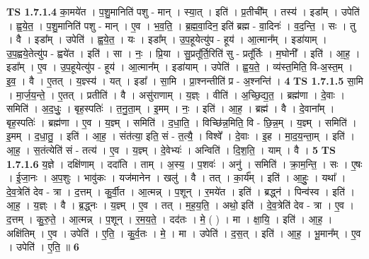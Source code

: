 \documentclass[17pt]{extarticle}
\begin{document}
                  \newline
                                \textbf{ TS 1.7.1.4} \newline
                  का॒मये॑त । प॒शु॒मानिति॑ पशु - मान् । स्या॒त् । इति॑ । प्र॒तीची᳚म् । तस्य॑ । इडा᳚म् । उपेति॑ । ह्व॒ये॒त॒ । प॒शु॒मानिति॑ पशु - मान् । ए॒व । भ॒व॒ति॒ । ब्र॒ह्म॒वा॒दिन॒ इति॑ ब्रह्म - वा॒दिनः॑ । व॒द॒न्ति॒ । सः । तु । वै । इडा᳚म् । उपेति॑ । ह्व॒ये॒त॒ । यः । इडा᳚म् । उ॒प॒हूयेत्यु॑प - हूय॑ । आ॒त्मान᳚म् । इडा॑याम् । उ॒प॒ह्वये॒तेत्यु॑प - ह्वये॑त । इति॑ । सा । नः॒ । प्रि॒या । सु॒प्रतू᳚र्ति॒रिति॑ सु - प्रतू᳚र्तिः । म॒घोनी᳚ । इति॑ । आ॒ह॒ । इडा᳚म् । ए॒व । उ॒प॒हूयेत्यु॑प - हूय॑ । आ॒त्मान᳚म् । इडा॑याम् । उपेति॑ । ह्व॒य॒ते॒ । व्य॑स्त॒मिति॒ वि-अ॒स्त॒म् । इ॒व॒ । वै । ए॒तत् । य॒ज्ञ्स्य॑ । यत् । इडा᳚ । सा॒मि । प्रा॒श्नन्तीति॑ प्र - अ॒श्नन्ति॑ । \textbf{  4} \newline
                  \newline
                                \textbf{ TS 1.7.1.5} \newline
                  सा॒मि । मा॒र्ज॒य॒न्ते॒ । ए॒तत् । प्रतीति॑ । वै । असु॑राणाम् । य॒ज्ञ्ः । वीति॑ । अ॒च्छि॒द्य॒त॒ । ब्रह्म॑णा । दे॒वाः । समिति॑ । अ॒द॒धुः॒ । बृह॒स्पतिः॑ । त॒नु॒ता॒म् । इ॒मम् । नः॒ । इति॑ । आ॒ह॒ । ब्रह्म॑ । वै । दे॒वाना᳚म् । बृह॒स्पतिः॑ । ब्रह्म॑णा । ए॒व । य॒ज्ञ्म् । समिति॑ । द॒धा॒ति॒ । विच्छि॑न्न॒मिति॒ वि - छि॒न्न॒म् । य॒ज्ञ्म् । समिति॑ । इ॒मम् । द॒धा॒तु॒ । इति॑ । आ॒ह॒ । संत॑त्या॒ इति॒ सं - त॒त्यै॒ । विश्वे᳚ । दे॒वाः । इ॒ह । मा॒द॒य॒न्ता॒म् । इति॑ । आ॒ह॒ । स॒तंत्येति॑ सं - तत्य॑ । ए॒व । य॒ज्ञ्म् । दे॒वेभ्यः॑ । अन्विति॑ । दि॒श॒ति॒ । याम् । वै । \textbf{  5} \newline
                  \newline
                                \textbf{ TS 1.7.1.6} \newline
                  य॒ज्ञे । दक्षि॑णाम् । ददा॑ति । ताम् । अ॒स्य॒ । प॒शवः॑ । अनु॑ । समिति॑ । क्रा॒म॒न्ति॒ । सः । ए॒षः । ई॒जा॒नः । अ॒प॒शुः । भावु॑कः । यज॑मानेन । खलु॑ । वै । तत् । का॒र्य᳚म् । इति॑ । आ॒हुः॒ । यथा᳚ । दे॒व॒त्रेति॑ देव - त्रा । द॒त्तम् । कु॒र्वी॒त । आ॒त्मन्न् । प॒शून् । र॒मये॑त । इति॑ । ब्रद्ध्न॑ । पिन्व॑स्व । इति॑ । आ॒ह॒ । य॒ज्ञ्ः । वै । ब्र॒द्ध्नः । य॒ज्ञ्म् । ए॒व । तत् । म॒ह॒य॒ति॒ । अथो॒ इति॑ । दे॒व॒त्रेति॑ देव - त्रा । ए॒व । द॒त्तम् । कु॒रु॒ते॒ । आ॒त्मन्न् । प॒शून् । र॒म॒य॒ते॒ । दद॑तः । मे॒ ( ) । मा । क्षा॒यि॒ । इति॑ । आ॒ह॒ । अक्षि॑तिम् । ए॒व । उपेति॑ । ए॒ति॒ । कु॒र्व॒तः । मे॒ । मा । उपेति॑ । द॒स॒त् । इति॑ । आ॒ह॒ । भू॒मान᳚म् । ए॒व । उपेति॑ । ए॒ति॒ ॥ \textbf{  6 } \newline
                  \newline
\end{document}
